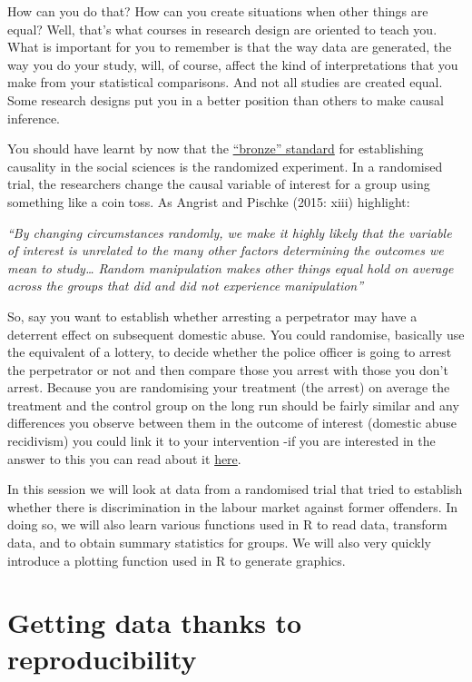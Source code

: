 \documentclass[]{book}
\theoremstyle{definition}
\theoremstyle{definition}
\theoremstyle{definition}
\theoremstyle{remark}
\begin{document}
How can you do that? How can you create situations when other things are
equal? Well, that's what courses in research design are oriented to
teach you. What is important for you to remember is that the way data
are generated, the way you do your study, will, of course, affect the
kind of interpretations that you make from your statistical comparisons.
And not all studies are created equal. Some research designs put you in
a better position than others to make causal inference.

You should have learnt by now that the
\href{https://link.springer.com/article/10.1007/s11292-005-3538-2}{``bronze''
standard} for establishing causality in the social sciences is the
randomized experiment. In a randomised trial, the researchers change the
causal variable of interest for a group using something like a coin
toss. As Angrist and Pischke (2015: xiii) highlight:

\emph{``By changing circumstances randomly, we make it highly likely
that the variable of interest is unrelated to the many other factors
determining the outcomes we mean to study\ldots{} Random manipulation
makes other things equal hold on average across the groups that did and
did not experience manipulation''}

So, say you want to establish whether arresting a perpetrator may have a
deterrent effect on subsequent domestic abuse. You could randomise,
basically use the equivalent of a lottery, to decide whether the police
officer is going to arrest the perpetrator or not and then compare those
you arrest with those you don't arrest. Because you are randomising your
treatment (the arrest) on average the treatment and the control group on
the long run should be fairly similar and any differences you observe
between them in the outcome of interest (domestic abuse recidivism) you
could link it to your intervention -if you are interested in the answer
to this you can read about it
\href{http://niccsa.org/uploads/file/f815aa02a0804639a53bb4a800952235/EFFECTSOFARRESTONINTIMATEPARTNERVIOLENCE.pdf}{here}.

In this session we will look at data from a randomised trial that tried
to establish whether there is discrimination in the labour market
against former offenders. In doing so, we will also learn various
functions used in R to read data, transform data, and to obtain summary
statistics for groups. We will also very quickly introduce a plotting
function used in R to generate graphics.

\hypertarget{getting-data-thanks-to-reproducibility}{%
\section{Getting data thanks to
reproducibility}\label{getting-data-thanks-to-reproducibility}}
\end{document}
